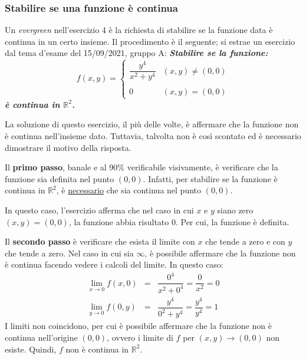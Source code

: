 \documentclass[a4paper]{article}
\begin{document}
	\subsubsection{Stabilire se una funzione è continua}

	Un \emph{evergreen} nell'esercizio 4 è la richiesta di stabilire se la funzione data è continua in un certo insieme. Il procedimento è il seguente; si estrae un esercizio dal tema d'esame del 15/09/2021, gruppo A: \textcolor{Green4}{\textbf{\emph{Stabilire se la funzione:}}
	\begin{equation*}
		f\left(x,y\right) = \begin{cases}
			\dfrac{y^{4}}{x^{2} + y^{4}} & \left(x,y\right) \ne \left(0,0\right) \\
			\\
			0	& \left(x,y\right) = \left(0,0\right)
		\end{cases}
	\end{equation*}
	\textbf{\emph{è continua in $\mathbb{R}^{2}$.}}}\newline

	\noindent
	La soluzione di questo esercizio, il più delle volte, è affermare che la funzione non è continua nell'insieme dato. Tuttavia, talvolta non è così scontato ed è necessario dimostrare il motivo della risposta.\newline
	
	\noindent
	Il \textbf{primo passo}, banale e al 90\% verificabile visivamente, è verificare che la funzione sia definita nel punto $\left(0,0\right)$. Infatti, per stabilire se la funzione è continua in $\mathbb{R}^{2}$, è \underline{necessario} che sia continua nel punto $\left(0,0\right)$.

	In questo caso, l'esercizio afferma che nel caso in cui $x$ e $y$ siano zero $\left(x,y\right) = \left(0,0\right)$, la funzione abbia risultato $0$. Per cui, la funzione è definita.\newline

	\noindent
	Il \textbf{secondo passo} è verificare che esista il limite con $x$ che tende a zero e con $y$ che tende a zero. Nel caso in cui sia $\infty$, è possibile affermare che la funzione non è continua facendo vedere i calcoli del limite. In questo caso:
	\begin{equation*}
		\begin{array}{rcl}
			\displaystyle\lim_{x \rightarrow 0} f\left(x,0\right) &=& \dfrac{0^{4}}{x^{2} + 0^{4}} = \dfrac{0}{x^{2}} = 0 \\ [1.5em]
			\displaystyle\lim_{y \rightarrow 0} f\left(0,y\right) &=& \dfrac{y^{4}}{0^{2} + y^{4}} = \dfrac{y^{4}}{y^{4}} = 1
		\end{array}
	\end{equation*}
	I limiti non coincidono, per cui è possibile affermare che la funzione non è continua nell'origine $\left(0,0\right)$, ovvero i limite di $f$ per $\left(x,y\right) \rightarrow \left(0,0\right)$ non esiste. Quindi, $f$ non è continua in $\mathbb{R}^{2}$.\newline
\end{document}
